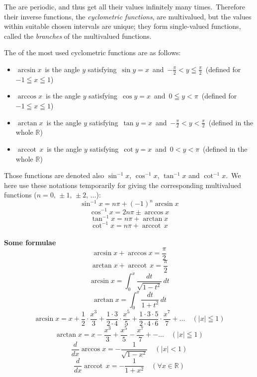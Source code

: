 \documentclass[12pt]{article}
\DeclareMathOperator{\arccot}{arccot}
\begin{document}
The  are periodic, and thus get all their values infinitely many times.\, Therefore their inverse functions, the {\em cyclometric functions}, are multivalued, but the values within suitable chosen intervals are unique; they form single-valued functions, called the \emph{branches} of the multivalued functions.

The  of the most used cyclometric functions are as follows:
\begin{itemize}
 \item $\arcsin{x}$\, is the angle $y$ satisfying\, $\sin y = x$\, and\, 
$-\frac{\pi}{2} < y \leqq \frac{\pi}{2}$\, (defined for $-1 \leqq x \leqq 1$)

 \item $\arccos{x}$\, is the angle $y$ satisfying\, $\cos y = x$\, and\, 
$0 \leqq y < \pi$\, (defined for $-1 \leqq x \leqq 1$)

 \item $\arctan{x}$\, is the angle $y$ satisfying\, $\tan y = x$\, and\, 
$-\frac{\pi}{2} < y < \frac{\pi}{2}$\, (defined in the whole $\mathbb{R}$)

 \item $\arccot\,{x}$\, is the angle $y$ satisfying\, $\cot y = x$\, and\, 
$0 < y < \pi$\, (defined in the whole $\mathbb{R}$) 
\end{itemize}

Those functions are denoted also $\sin^{-1}x$, $\cos^{-1}x$, $\tan^{-1}x$ and $\cot^{-1}x$.\, We here use these notations temporarily for giving the corresponding multivalued functions ($n = 0,\, \pm1,\, \pm2,\, ...$):
$$\sin^{-1}x = n\pi+(-1)^n\arcsin{x}$$
$$\cos^{-1}x = 2n\pi\pm\arccos{x}$$
$$\tan^{-1}x = n\pi+\arctan{x}$$
$$\cot^{-1}x = n\pi+\arccot\,{x}$$\\

\textbf{Some formulae}
$$\arcsin{x}+\arccos{x} = \frac{\pi}{2}$$
$$\arctan{x}+\arccot\,{x} = \frac{\pi}{2}$$
$$\arcsin{x} = \int_0^x\frac{dt}{\sqrt{1-t^2}}\,dt$$
$$\arctan{x} = \int_0^x\frac{dt}{1+t^2}\,dt$$
$$\arcsin{x} = x+\frac{1}{2}\!\cdot\!\frac{x^3}{3}+
\frac{1\!\cdot\!3}{2\!\cdot\!4}\!\cdot\!\frac{x^5}{5}+
\frac{1\!\cdot\!3\!\cdot\!5}{2\!\cdot\!4\!\cdot\! 6}\!\cdot\!\frac{x^7}{7}+\ldots\quad(|x|\leqq 1)$$
$$\arctan{x} = x-\frac{x^3}{3}+\frac{x^5}{5}-\frac{x^7}{7}+-\ldots
\quad(|x| \leqq 1)$$
$$\frac{d}{dx}\arccos{x} = -\frac{1}{\sqrt{1-x^2}}\quad(|x| < 1)$$
$$\frac{d}{dx}\arccot\,{x} = -\frac{1}{1+x^2}\quad(\forall x\in \mathbb{R})$$
\end{document}
